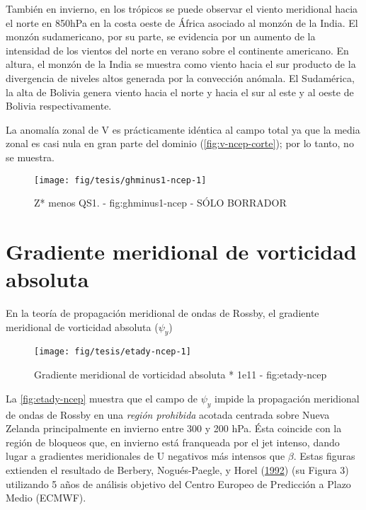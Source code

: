 \documentclass[spanish,a4paper]{book}
\begin{document}
También en invierno, en los trópicos se puede observar el viento
meridional hacia el norte en 850hPa en la costa oeste de África asociado
al monzón de la India. El monzón sudamericano, por su parte, se
evidencia por un aumento de la intensidad de los vientos del norte en
verano sobre el continente americano. En altura, el monzón de la India
se muestra como viento hacia el sur producto de la divergencia de
niveles altos generada por la convección anómala. El Sudamérica, la alta
de Bolivia genera viento hacia el norte y hacia el sur al este y al
oeste de Bolivia respectivamente.

La anomalía zonal de V es prácticamente idéntica al campo total ya que
la media zonal es casi nula en gran parte del dominio
(\autoref{fig:v-ncep-corte}); por lo tanto, no se muestra.

\begin{figure}

{\centering \texttt{[image: fig/tesis/ghminus1-ncep-1]} 

}

\caption{Z* menos QS1. - fig:ghminus1-ncep - SÓLO BORRADOR}\label{fig:ghminus1-ncep}
\end{figure}

\section{Gradiente meridional de vorticidad
absoluta}\label{gradiente-meridional-de-vorticidad-absoluta}

En la teoría de propagación meridional de ondas de Rossby, el gradiente
meridional de vorticidad absoluta (\(\psi_y\))

\begin{figure}

{\centering \texttt{[image: fig/tesis/etady-ncep-1]} 

}

\caption{Gradiente meridional de vorticidad absoluta * 1e11 - fig:etady-ncep}\label{fig:etady-ncep}
\end{figure}

La \autoref{fig:etady-ncep} muestra que el campo de \(\psi_y\) impide la
propagación meridional de ondas de Rossby en una \emph{región prohibida}
acotada centrada sobre Nueva Zelanda principalmente en invierno entre
300 y 200 hPa. Ésta coincide con la región de bloqueos que, en invierno
está franqueada por el jet intenso, dando lugar a gradientes
meridionales de U negativos más intensos que \(\beta\). Estas figuras
extienden el resultado de Berbery, Nogués-Paegle, y Horel
(\protect\hyperlink{ref-Berbery1992}{1992}) (su Figura 3) utilizando 5
años de análisis objetivo del Centro Europeo de Predicción a Plazo Medio
(ECMWF).
\end{document}
